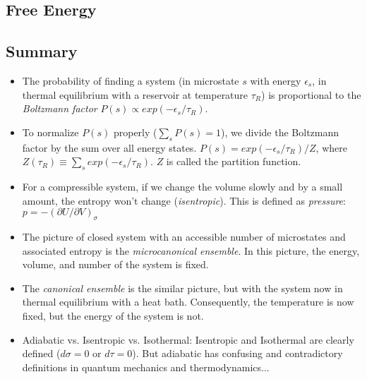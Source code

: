 \subsection{Free Energy}


\subsection{Summary}

\begin{itemize}
\item The probability of finding a system (in microstate $s$ with
	energy $\epsilon_s$, in thermal equilibrium with a reservoir 
	at temperature $\tau_R$) is proportional to the 
	\emph{Boltzmann factor} $P(s) \propto exp(-\epsilon_s/\tau_R)$.

\item To normalize $P(s)$ properly ($\sum_{s} P(s) = 1$), we divide
	the Boltzmann factor by the sum over all energy states.
	$P(s) = exp(-\epsilon_s/\tau_R)/Z$, where 
	$Z(\tau_R) \equiv \sum_{s} exp(-\epsilon_s/\tau_R)$. $Z$ is called the
	partition function.

\item For a compressible system, if we change the volume slowly and by
	a small amount, the entropy won't change (\textit{isentropic}). This
	is defined as \textit{pressure}: $p = -(\partial U/\partial V)_\sigma$

\item The picture of closed system with an accessible number of microstates
	and associated entropy is the \emph{microcanonical ensemble}. In this picture, the energy, volume, and number of the system is fixed.

\item The \emph{canonical ensemble} is the similar picture, but with 
	the system now in thermal equilibrium with a heat bath. Consequently,
	the temperature is now fixed, but the energy of the system is not.

\item Adiabatic vs. Isentropic vs. Isothermal: Isentropic and 
	Isothermal are clearly defined ($d\sigma = 0$ or $d\tau = 0$). But
	adiabatic has confusing and contradictory definitions in quantum
	mechanics and thermodynamics...
\end{itemize}




